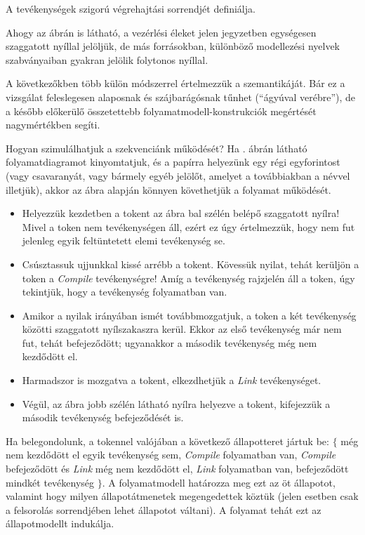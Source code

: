 \begin{definicio}
	A  tevékenységek szigorú végrehajtási sorrendjét definiálja.
\end{definicio}


\begin{megjegyzes}
Ahogy az ábrán is látható, a vezérlési éleket jelen jegyzetben egységesen szaggatott nyíllal jelöljük, de más forrásokban, különböző modellezési nyelvek szabványaiban gyakran jelölik folytonos nyíllal. 
\end{megjegyzes}


A következőkben több külön módszerrel értelmezzük a  szemantikáját. Bár ez a vizsgálat feleslegesen alaposnak és szájbarágósnak tűnhet (``ágyúval verébre''), de a később előkerülő összetettebb folyamatmodell-konstrukciók megértését nagymértékben segíti.

\begin{pelda}
Hogyan szimulálhatjuk a szekvenciánk működését? Ha . ábrán látható folyamatdiagramot kinyomtatjuk, és a papírra helyezünk egy régi egyforintost (vagy csavaranyát, vagy bármely egyéb jelölőt, amelyet a továbbiakban a  névvel illetjük), akkor az ábra alapján könnyen követhetjük a folyamat működését. \begin{itemize}
  \item Helyezzük kezdetben a tokent az ábra bal szélén belépő szaggatott nyílra! Mivel a token nem tevékenységen áll, ezért ez úgy értelmezzük, hogy nem fut jelenleg egyik feltüntetett elemi tevékenység se.
  \item Csúsztassuk ujjunkkal kissé arrébb a tokent. Kövessük nyilat, tehát kerüljön a token a \emph{Compile} tevékenységre! Amíg a tevékenység rajzjelén áll a token, úgy tekintjük, hogy a tevékenység folyamatban van.
  \item Amikor a nyilak irányában ismét továbbmozgatjuk, a token a két tevékenység közötti szaggatott nyílszakaszra kerül. Ekkor az első tevékenység már nem fut, tehát befejeződött; ugyanakkor a második tevékenység még nem kezdődött el.
  \item Harmadszor is mozgatva a tokent, elkezdhetjük a \emph{Link} tevékenységet.
  \item Végül, az ábra jobb szélén látható nyílra helyezve a tokent, kifejezzük a második tevékenység befejeződését is.
\end{itemize}
Ha belegondolunk, a tokennel valójában  a következő állapotteret jártuk be: $\{$ még nem kezdődött el egyik tevékenység sem, \emph{Compile} folyamatban van, \emph{Compile} befejeződött és \emph{Link} még nem kezdődött el, \emph{Link} folyamatban van, befejeződött mindkét tevékenység $\}$. A folyamatmodell határozza meg ezt az öt állapotot, valamint hogy milyen állapotátmenetek megengedettek köztük (jelen esetben csak a felsorolás sorrendjében lehet állapotot váltani). A folyamat tehát ezt az állapotmodellt indukálja.
\end{pelda}

